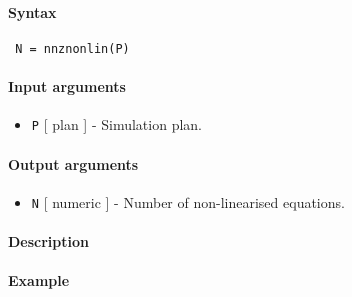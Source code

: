 


	\paragraph{Syntax}
 
 \begin{verbatim}
 N = nnznonlin(P)
 \end{verbatim}
 
 \paragraph{Input arguments}
 
 \begin{itemize}
 \item
   \texttt{P} {[} plan {]} - Simulation plan.
 \end{itemize}
 
 \paragraph{Output arguments}
 
 \begin{itemize}
 \item
   \texttt{N} {[} numeric {]} - Number of non-linearised equations.
 \end{itemize}
 
 \paragraph{Description}
 
 \paragraph{Example}


